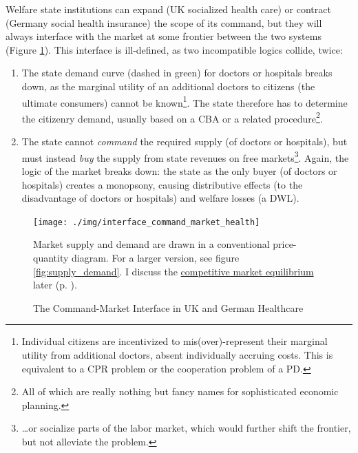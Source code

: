 Welfare state institutions can expand (UK socialized health care) or contract (Germany social health insurance) the scope of its command, but they will always interface with the market at some frontier between the two systems (Figure \ref{fig:interface_command_market_health}). This interface is ill-defined, as two incompatible logics collide, twice: 
\begin{enumerate}
	\item The state demand curve (dashed in green) for doctors or hospitals breaks down, as the marginal utility of an additional doctors to citizens (the ultimate consumers) cannot be known\footnote
		{Individual citizens are incentivized to mis(over)-represent their marginal utility from additional doctors, absent individually accruing costs. This is equivalent to a \gls{CPR} problem or the cooperation problem of a \gls{PD}.}. 
	The state therefore has to determine the citizenry demand, usually based on a \gls{CBA} or a related procedure\footnote
		{All of which are really nothing but fancy names for sophisticated economic planning.}. 
	\item The state cannot \emph{command} the required supply (of doctors or hospitals), but must instead \emph{buy} the supply from state revenues on free markets\footnote
		{\ldots or socialize parts of the labor market, which would further shift the frontier, but not alleviate the problem.}. 
	Again, the logic of the market breaks down: the state as the only buyer (of doctors or hospitals) creates a monopsony, causing distributive effects (to the disadvantage of doctors or hospitals) and welfare losses (a \gls{DWL}).
\end{enumerate}

\begin{landscape}
 \begin{figure}[htbp]
	\begin{center}
	\texttt{[image: ./img/interface\_command\_market\_health]}  
	\caption[Command-Market Interface in UK and German Healthcare]{The Command-Market Interface in UK and German Healthcare}
	\label{fig:interface_command_market_health}
	\end{center}
	\scriptsize{Market supply and demand are drawn in a conventional price-quantity diagram. For a larger version, see figure \ref{fig:supply_demand}. I discuss the \hyperref[sec:market_solutions_production]{competitive market equilibrium} later (p. \pageref{sec:market_solutions_production}).}
\end{figure}
\end{landscape}

